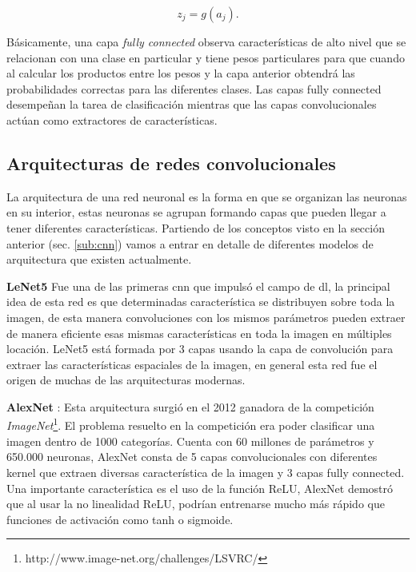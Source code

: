 \begin{equation}\label{eq:output-fully-conected}
z_j = g(a_j).
\end{equation}

Básicamente, una capa \textit{fully connected} observa características de alto nivel que se relacionan con una clase en particular y tiene pesos particulares para que cuando al calcular los productos entre los pesos y la capa anterior obtendrá las probabilidades correctas para las diferentes clases. Las capas fully connected desempeñan  la tarea de clasificación mientras que las capas convolucionales actúan como extractores de características.



\subsection{Arquitecturas de redes convolucionales}\label{sub:arquitecturacnn}
La arquitectura de una red neuronal es la forma en que se organizan  las neuronas en su interior, estas neuronas se agrupan formando capas que pueden llegar a tener diferentes características. Partiendo de los conceptos visto en la sección anterior (sec. \ref{sub:cnn})  vamos a entrar en detalle de diferentes modelos de arquitectura que existen actualmente.

\par \textbf{LeNet5} \citep{lenet} Fue una de las primeras \ac{cnn} que impulsó el campo de \ac{dl}, la principal idea de esta red es que determinadas característica se distribuyen sobre toda la imagen, de esta manera convoluciones con los mismos parámetros pueden extraer de manera eficiente esas mismas características en toda la imagen en múltiples locación. LeNet5 está formada por 3 capas usando la capa de convolución para extraer las características espaciales de la imagen, en general esta red fue el origen de muchas de las arquitecturas modernas.

\par \textbf{AlexNet} \citep{alexnet}: Esta arquitectura surgió en el 2012 ganadora de la competición \textit{ImageNet}\footnote{http://www.image-net.org/challenges/LSVRC/}. El problema resuelto en la competición era poder clasificar una imagen dentro de 1000 categorías. Cuenta con 60 millones de parámetros y 650.000 neuronas, AlexNet consta de 5 capas convolucionales con diferentes kernel que extraen diversas característica de la imagen  y 3 capas fully connected. Una importante característica es el uso de la función ReLU,  AlexNet demostró que al usar la no linealidad ReLU,  podrían entrenarse mucho más rápido que  funciones de activación como  tanh o sigmoide.


